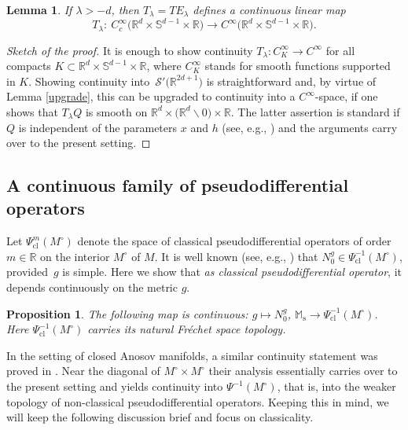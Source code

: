 \documentclass[10pt,a4paper]{amsart}
\numberwithin{equation}{section}
\newtheorem{Lemma}[Theorem]{Lemma}
\newtheorem{Proposition}[Theorem]{Proposition}
\theoremstyle{definition}
\newcommand{\R}{\mathbb{R}} %
\newcommand{\M}{\mathbb{M}}
\newcommand{\Ms}{\M_{\mathrm{s}}}
\newcommand{\1}{{\bf 1}}
\newcommand{\cl}{\mathrm{cl}}
\begin{document}
\begin{Lemma}\label{tlambda}
	If $\lambda>-d$, then $T_\lambda=T E_\lambda$ defines a continuous linear map
	\[
	T_\lambda\colon\ C_c^\infty\bigl(\R^d\times \mathbb S^{d-1}\times \R\bigr) \rightarrow C^\infty\bigl(\R^d\times \mathbb S^{d-1}\times \R\bigr).
	\]	
\end{Lemma}

\begin{proof}[Sketch of the proof]
It is enough to show continuity $T_\lambda\colon C_K^\infty\to C^\infty$ for all compacts $K\subset \R^d\times \mathbb S^{d-1} \times \R$, where $C^\infty_K$ stands for smooth functions supported in $K$. Showing continuity into~$\mathcal S'\bigl(\R^{2d+1}\bigr)$ is straightforward and, by virtue of Lemma \ref{upgrade}, this can be upgraded to continuity into a $C^\infty$-space, if one shows that $T_\lambda Q$ is smooth on $\R^d\times \bigl(\R^d\backslash 0\bigr) \times \R$. The latter assertion is standard if $Q$ is independent of the parameters $x$ and $h$ (see, e.g., \cite[Section~7.4]{Ste93}) and the arguments carry over to the present setting.
\end{proof}

\subsection{A continuous family of pseudodifferential operators}\label{ctspsido}
 Let $\Psi^m_\cl(M^\circ)$ denote the space of classical pseudodifferential operators of order $m\in \R$ on the interior $M^\circ$ of $M$. It is well known (see, e.g., \cite[Theorem~8.1.1]{PSU23}) that
$
N_0^g\in \Psi^{-1}_\cl(M^\circ)$,
provided~$g$ is simple. Here we show that {\it as classical pseudodifferential operator}, it depends continuously on the metric $g$.

\begin{Proposition}\label{claim2}
The following map is continuous:
$
g\mapsto N_0^g$, $ \Ms \rightarrow \Psi^{-1}_\cl(M^\circ)$.
Here $\Psi^{-1}_\cl(M^\circ)$ carries its natural Fr{\'e}chet space topology.
\end{Proposition}


In the setting of closed Anosov manifolds, a similar continuity statement was proved in \cite[Proposition~4.1]{GKL22}. Near the diagonal of $M^\circ \times M^\circ$ their analysis essentially carries over to the present setting and yields continuity into $\Psi^{-1}(M^\circ)$, that is, into the weaker topology of non-classical pseudodifferential operators. Keeping this in mind, we will keep the following discussion brief and focus on classicality.
\end{document}
